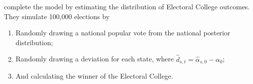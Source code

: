 \documentclass[thesis.tex]{subfiles}
\begin{document}
\cite{Lock:2010aa} complete the model by estimating the distribution of Electoral College outcomes. They simulate 100,000 elections by \begin{enumerate}
	\item Randomly drawing a national popular vote from the national posterior distribution;
	\item Randomly drawing a deviation for each state, where \(\widehat{d}_{s, t} = \widehat{\alpha}_{s, 0} - \alpha_0\);
	\item And calculating the winner of the Electoral College.
\end{enumerate}

\begin{comment}

So, basically, first we look at what \cite{Lock:2010aa} are doing, because it's a nice example for Bayesian inference, and because the approach taken by \cite{Strauss:2007aa} uses Gibbs sampling and gets complicated.

Suppose a poll is centered on the result of an election \(\alpha,\) with some amount of variance \(sigma^2\). Given a prior on the result of the election, which is centered at \(\mu\) with some variance \(v^2\), Bayes' rule tells us that \[
	\alpha | y \sim \N \left[ \left(\frac{\mu}{v^2} + \frac{y}{\sigma^2}\right) \left( \frac{1}{v^2} + \frac{1}{\sigma^2} \right), \left( \frac{1}{v^2} + \frac{1}{\sigma^2} \right) \right].
\]

How do we find out that variance term? Or, how much information does a poll have? (the variance from the election result)

Remember our problems: low reliability earlier in a campaign year, organizational biases.

First we'll talk about low reliability earlier in a campaign year

\end{comment}
\end{document}

